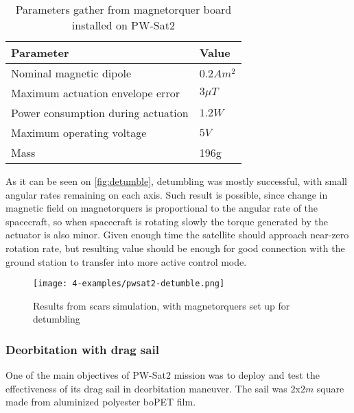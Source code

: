             \begin{table}[H]
                \centering    
                \small
                \begin{tabular}{l l}
                    \textbf{Parameter} & \textbf{Value} \\ \hline
                    Nominal magnetic dipole & $0.2 Am^2$ \\
                    Maximum actuation envelope error & $3\mu T$ \\
                    Power consumption during actuation & $1.2W$ \\
                    Maximum operating voltage & $5V$ \\
                    Mass & 196g \\ \hline
                \end{tabular}
                \caption{Parameters gather from magnetorquer board installed on PW-Sat2}\label{table:pwsat2magne}
            \end{table}

            As it can be seen on \autoref{fig:detumble}, detumbling was mostly successful, with small angular rates remaining on each axis. Such result is possible, since change in magnetic field on magnetorquers is proportional to the angular rate of the spacecraft, so when spacecraft is rotating slowly the torque generated by the actuator is also minor. Given enough time the satellite should approach near-zero rotation rate, but resulting value should be enough for good connection with the ground station to transfer into more active control mode. 

            \begin{figure}[H]
                \centering
                \texttt{[image: 4-examples/pwsat2-detumble.png]}
                \caption{Results from \ac{scars} simulation, with magnetorquers set up for detumbling}
                \label{fig:detumble}
            \end{figure}

        \subsubsection{Deorbitation with drag sail}
            One of the main objectives of PW-Sat2 mission was to deploy and test the effectiveness of its drag sail in deorbitation maneuver. The sail was  $2$x$2m$ square made from aluminized polyester boPET film\cite{pwsat2dt}.
            
